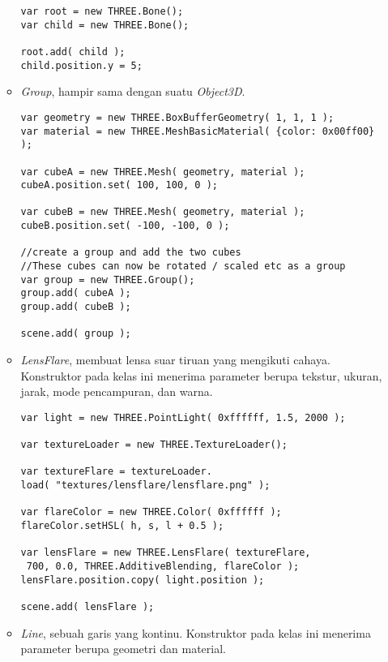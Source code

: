 \begin{itemize}
\begin{itemize}
\begin{lstlisting}[caption={Contoh penggunaan kelas {\it Bone}.},captionpos=b]
var root = new THREE.Bone();
var child = new THREE.Bone();

root.add( child );
child.position.y = 5;
\end{lstlisting}
	
	\item {\it Group}, hampir sama dengan suatu {\it Object3D}.
	
\begin{lstlisting}[caption={Contoh penggunaan kelas {\it Group}.},captionpos=b]
var geometry = new THREE.BoxBufferGeometry( 1, 1, 1 );
var material = new THREE.MeshBasicMaterial( {color: 0x00ff00} );

var cubeA = new THREE.Mesh( geometry, material );
cubeA.position.set( 100, 100, 0 );

var cubeB = new THREE.Mesh( geometry, material );
cubeB.position.set( -100, -100, 0 );

//create a group and add the two cubes
//These cubes can now be rotated / scaled etc as a group
var group = new THREE.Group();
group.add( cubeA );
group.add( cubeB );

scene.add( group );
\end{lstlisting}
	
	\item {\it LensFlare}, membuat lensa suar tiruan yang mengikuti cahaya. Konstruktor pada kelas ini menerima parameter berupa tekstur, ukuran, jarak, mode pencampuran, dan warna. 
	
\begin{lstlisting}[caption={Contoh penggunaan kelas {\it LensFlare}.},captionpos=b]
var light = new THREE.PointLight( 0xffffff, 1.5, 2000 );

var textureLoader = new THREE.TextureLoader();

var textureFlare = textureLoader.
load( "textures/lensflare/lensflare.png" );

var flareColor = new THREE.Color( 0xffffff );
flareColor.setHSL( h, s, l + 0.5 );

var lensFlare = new THREE.LensFlare( textureFlare,
 700, 0.0, THREE.AdditiveBlending, flareColor );
lensFlare.position.copy( light.position );

scene.add( lensFlare );
\end{lstlisting}
	
	\item {\it Line}, sebuah garis yang kontinu. Konstruktor pada kelas ini menerima parameter berupa geometri dan material.
	

\end{itemize}
\end{itemize}
